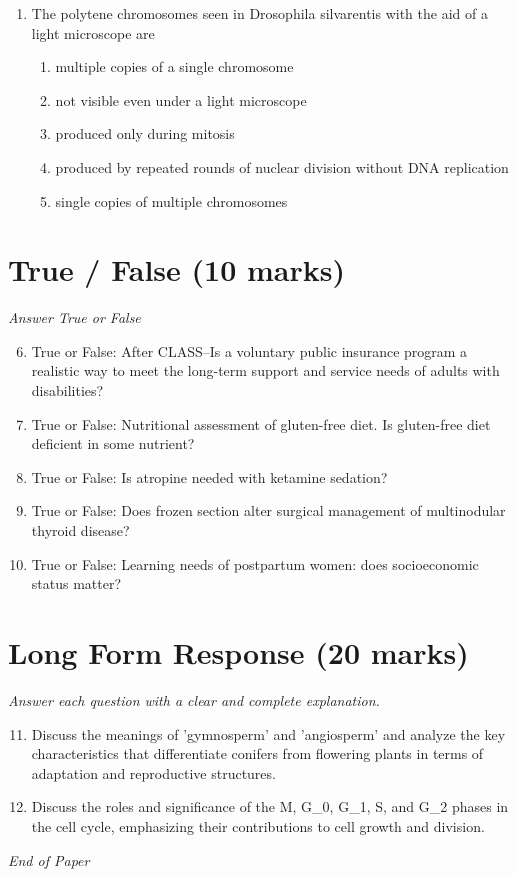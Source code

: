 \documentclass[12pt]{article}
\begin{document}
\begin{enumerate}[label=\arabic*.]
\begin{enumerate}[label=(\alph*)]
    \item homeotic genes
    \item cell division
    \item signal transduction
    \item cell differentiation
    \item apoptosis
\end{enumerate}
\item The polytene chromosomes seen in Drosophila silvarentis with the aid of a light microscope are
\begin{enumerate}[label=(\alph*)]
    \item multiple copies of a single chromosome
    \item not visible even under a light microscope
    \item produced only during mitosis
    \item produced by repeated rounds of nuclear division without DNA replication
    \item single copies of multiple chromosomes
\end{enumerate}
\end{enumerate}

\section*{True / False (10 marks)}
\textit{Answer True or False}
\begin{enumerate}[label=\arabic*.]
\setcounter{enumi}{5}
\item True or False: After CLASS--Is a voluntary public insurance program a realistic way to meet the long-term support and service needs of adults with disabilities?
\item True or False: Nutritional assessment of gluten-free diet. Is gluten-free diet deficient in some nutrient?
\item True or False: Is atropine needed with ketamine sedation?
\item True or False: Does frozen section alter surgical management of multinodular thyroid disease?
\item True or False: Learning needs of postpartum women: does socioeconomic status matter?
\end{enumerate}

\section*{Long Form Response (20 marks)}
\textit{Answer each question with a clear and complete explanation.}
\begin{enumerate}[label=\arabic*.]
\setcounter{enumi}{10}
\item Discuss the meanings of 'gymnosperm' and 'angiosperm' and analyze the key characteristics that differentiate conifers from flowering plants in terms of adaptation and reproductive structures.
\item Discuss the roles and significance of the M, G\_0, G\_1, S, and G\_2 phases in the cell cycle, emphasizing their contributions to cell growth and division.
\end{enumerate}

\vfill
\noindent\textit{End of Paper}
\end{document}
